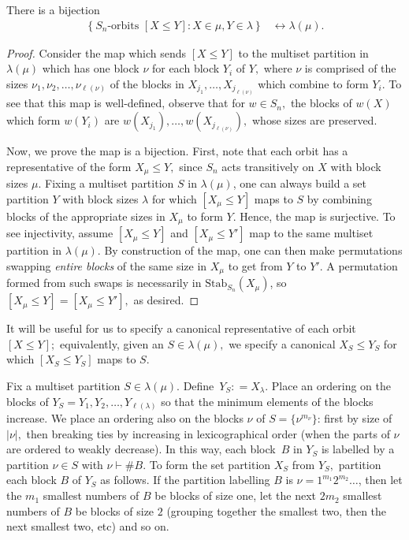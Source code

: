\documentclass[ALCO, Unicode]{cedram}
\def\stab{\mathrm{Stab}}
\begin{document}
\begin{lemma} \label{lem:bij-w-lambda(mu)}
There is a bijection 
\begin{align*}
    \left\{S_n\text{-orbits }[X \leq Y]: X \in \mu, Y \in \lambda\right\}&\longleftrightarrow \lambda(\mu).
\end{align*}
\end{lemma}
\begin{proof}

Consider the map which sends $[X \leq Y]$ to the multiset partition in $\lambda(\mu)$ which has one block $\nu$ for each block $Y_i$ of $Y,$ where $\nu$ is comprised of the sizes $\nu_1, \nu_2, \ldots, \nu_{\ell(\nu)}$ of the blocks in $X_{j_1}, \ldots, X_{j_{\ell(\nu)}}$ which combine to form $Y_i.$ To see that this map is well-defined, observe that for $w \in S_n,$ the blocks of $w(X)$ which form $w(Y_i)$ are $w\left(X_{j_1}\right), \ldots, w \left(X_{j_{\ell(\nu)}}\right),$ whose sizes are preserved.

Now, we prove the map is a bijection. First, note that each orbit has a representative of the form $X_\mu \leq Y,$ since $S_n$ acts transitively on $X$ with block sizes $\mu.$  Fixing a multiset partition $S$ in $\lambda(\mu)$, one can always build a set partition $Y$ with block sizes $\lambda$ for which $[X_\mu \leq Y]$ maps to $S$ by combining blocks of the appropriate sizes in $X_\mu$ to form $Y$. Hence, the map is surjective. To see injectivity, assume $[X_\mu \leq Y]$ and $[X_\mu \leq Y']$ map to the same multiset partition in $\lambda(\mu)$. By construction of the map, one can then make permutations swapping \textit{entire blocks} of the same size in $X_\mu$ to get from $Y$ to $Y'$. A permutation formed from such swaps is necessarily in $\stab_{S_n}(X_\mu)$, so $[X_\mu \leq Y] = [X_\mu \leq Y'],$ as desired.
\end{proof}


It will be useful for us to specify a canonical representative of each orbit $[X \leq Y];$ equivalently, given an $S \in \lambda(\mu),$ we specify a canonical $X_S \leq Y_S$ for which $[X_S \leq Y_S]$ maps to $S.$ 
\begin{defi}[Definition of $X_S, Y_S$]\label{def:XS-YS}
Fix a multiset partition $S \in \lambda(\mu).$ Define~\textbf{$Y_S: = X_\lambda.$} Place an ordering on the blocks of $Y_S = Y_1, Y_2, \ldots, Y_{\ell(\lambda)}$ so that the minimum elements of the blocks increase. We place an ordering also on the blocks $\nu$ of $S = \{\nu^{m_\nu}\}$: first by size of $|\nu|,$ then breaking ties by increasing in lexicographical order (when the parts of $\nu$ are ordered to weakly decrease). In this way, each block~$B$ in $Y_S$ is labelled by a partition $\nu \in S$ with $\nu \vdash \# B.$ To form the set partition $X_S$ from $Y_S,$ partition each block $B$ of $Y_S$ as follows. If the partition labelling $B$ is $\nu = 1^{m_1}2^{m_2}\ldots$, then let the $m_1$ smallest numbers of $B$ be blocks of size one,  let the next $2m_2$ smallest numbers of $B$ be blocks of size $2$ (grouping together the smallest two, then the next smallest two, etc) and so on.
\end{defi}
\end{document}
